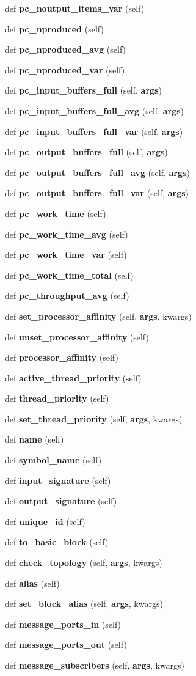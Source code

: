 \begin{DoxyCompactItemize}
\item 
def {\bf pc\+\_\+noutput\+\_\+items\+\_\+var} (self)
\item 
def {\bf pc\+\_\+nproduced} (self)
\item 
def {\bf pc\+\_\+nproduced\+\_\+avg} (self)
\item 
def {\bf pc\+\_\+nproduced\+\_\+var} (self)
\item 
def {\bf pc\+\_\+input\+\_\+buffers\+\_\+full} (self, {\bf args})
\item 
def {\bf pc\+\_\+input\+\_\+buffers\+\_\+full\+\_\+avg} (self, {\bf args})
\item 
def {\bf pc\+\_\+input\+\_\+buffers\+\_\+full\+\_\+var} (self, {\bf args})
\item 
def {\bf pc\+\_\+output\+\_\+buffers\+\_\+full} (self, {\bf args})
\item 
def {\bf pc\+\_\+output\+\_\+buffers\+\_\+full\+\_\+avg} (self, {\bf args})
\item 
def {\bf pc\+\_\+output\+\_\+buffers\+\_\+full\+\_\+var} (self, {\bf args})
\item 
def {\bf pc\+\_\+work\+\_\+time} (self)
\item 
def {\bf pc\+\_\+work\+\_\+time\+\_\+avg} (self)
\item 
def {\bf pc\+\_\+work\+\_\+time\+\_\+var} (self)
\item 
def {\bf pc\+\_\+work\+\_\+time\+\_\+total} (self)
\item 
def {\bf pc\+\_\+throughput\+\_\+avg} (self)
\item 
def {\bf set\+\_\+processor\+\_\+affinity} (self, {\bf args}, kwargs)
\item 
def {\bf unset\+\_\+processor\+\_\+affinity} (self)
\item 
def {\bf processor\+\_\+affinity} (self)
\item 
def {\bf active\+\_\+thread\+\_\+priority} (self)
\item 
def {\bf thread\+\_\+priority} (self)
\item 
def {\bf set\+\_\+thread\+\_\+priority} (self, {\bf args}, kwargs)
\item 
def {\bf name} (self)
\item 
def {\bf symbol\+\_\+name} (self)
\item 
def {\bf input\+\_\+signature} (self)
\item 
def {\bf output\+\_\+signature} (self)
\item 
def {\bf unique\+\_\+id} (self)
\item 
def {\bf to\+\_\+basic\+\_\+block} (self)
\item 
def {\bf check\+\_\+topology} (self, {\bf args}, kwargs)
\item 
def {\bf alias} (self)
\item 
def {\bf set\+\_\+block\+\_\+alias} (self, {\bf args}, kwargs)
\item 
def {\bf message\+\_\+ports\+\_\+in} (self)
\item 
def {\bf message\+\_\+ports\+\_\+out} (self)
\item 
def {\bf message\+\_\+subscribers} (self, {\bf args}, kwargs)
\end{DoxyCompactItemize}

